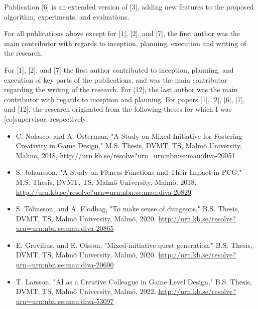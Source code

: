 \documentclass[hidelinks,green,onecolumn,twoside]{dissertation}
\begin{document}
{\selectfont

Publication [6] is an extended version of [3], adding new features to the proposed algorithm, experiments, and evaluations.

For all publications above except for [1], [2], and [7], the first author was the main contributor with regards to inception, planning, execution and writing of the research. %

For [1], [2], and [7] the first author contributed to inception, planning, and execution of key parts of the publications, and was the main contributor regarding the writing of the research. For [12], the last author was the main contributor with regards to inception and planning. For papers [1], [2], [6], [7], and [12], the research originated from the following theses for which I was [co]supervisor, respectively:

\begin{itemize}
    \item C. Nolasco, and A. Österman, "A Study on Mixed-Initiative for Fostering Creativity in Game Design," M.S. Thesis, DVMT, TS, Malmö University, Malmö, 2018, \url{http://urn.kb.se/resolve?urn=urn:nbn:se:mau:diva-20051}
    
    \item S. Johansson, "A Study on Fitness Functions and Their Impact in PCG," M.S. Thesis, DVMT, TS, Malmö University, Malmö, 2018. \url{http://urn.kb.se/resolve?urn=urn:nbn:se:mau:diva-20829}
    
    \item S. Tolinsson, and A. Flodhag, "To make sense of dungeons," B.S. Thesis, DVMT, TS, Malmö University, Malmö, 2020. \url{http://urn.kb.se/resolve?urn=urn:nbn:se:mau:diva-20865}
    
    \item E. Grevilius, and E. Olsson, "Mixed-initiative quest generation," B.S. Thesis, DVMT, TS, Malmö University, Malmö, 2020. \url{http://urn.kb.se/resolve?urn=urn:nbn:se:mau:diva-20600}
    
    \item T. Larsson, "AI as a Creative Colleague in Game Level Design," B.S. Thesis, DVMT, TS, Malmö University, Malmö, 2022. \url{http://urn.kb.se/resolve?urn=urn:nbn:se:mau:diva-53097}
\end{itemize}
    
    
    
}
\end{document}
